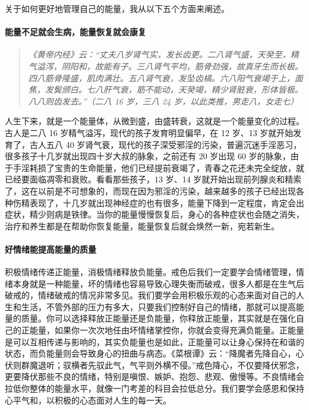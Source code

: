 关于如何更好地管理自己的能量，我从以下五个方面来阐述。

\paragraph{能量不足就会生病，能量恢复就会康复}

\begin{quote}\it
    《黄帝内经》云：“丈夫八岁肾气实，发长齿更。二八肾气盛，天癸至，精气溢泻，阴阳和，故能有子。三八肾气平均，筋骨劲强，故真牙生而长极。四八筋骨隆盛，肌肉满壮。五八肾气衰，发坠齿槁。六八阳气衰竭于上，面焦，发鬓颁白。七八肝气衰，筋不能动，天癸竭，精少肾脏衰，形体皆极。八八则齿发去。”（二八 16 岁，三八 24 岁，以此类推，男走八，女走七）
\end{quote}

人生下来，就是一个能量体，从微到盛，由盛转衰，这就是一个能量变化的过程。古人是二八 16 岁精气溢泻，现代的孩子发育明显偏早，在 12 岁、13 岁就开始发育了，古人五八 40 岁肾气衰，现代的孩子深受邪淫的污染，普遍沉迷手淫恶习，很多孩子十几岁就出现四十岁大叔的脉象，之前还有 20 岁出现 60 岁的脉象，由于手淫耗损了宝贵的生命能量，他们已经提前衰竭了，青春之花还未完全绽放，就已经要面临凋零和衰败。看看那些孩子，13 岁、14 岁就开始出现前列腺炎和精索了，这在以前是不可想象的，而现在因为邪淫的污染，越来越多的孩子已经出现各种伤精表现了，十几岁就出现神经症的也有很多，能量下降到一定程度，肯定会出症状，精少则病是铁律。当你的能量慢慢恢复后，身心的各种症状也会随之消失，治疗和养生都是在帮助你恢复能量，能量恢复后就会焕然一新，宛若新生。

\paragraph{好情绪能提高能量的质量}

积极情绪传递正能量，消极情绪释放负能量。戒色后我们一定要学会情绪管理，情绪本身就是一种能量，坏的情绪也容易导致心理失衡而破戒，很多人都是在生气后破戒的，情绪破戒的情况非常多见。我们要学会用积极乐观的心态来面对自己的人生和生活，不管外部的压力有多大，只要我们控制好自己的情绪，那就可以提高能量的质量。你可以选择释放正能量还是负能量，你释放正能量，其实就是在强化自己的正能量，如果你一次次地任由坏情绪掌控你，你就会变得充满负能量。正能量是可以互相传递与影响的，其实负能量也是如此，正能量可以让身心保持在和谐的状态，而负能量则会导致身心的扭曲与病态。《菜根谭》云：“降魔者先降自心，心伏则群魔退听；驭横者先驭此气，气平则外横不侵。”戒色降心，不仅要降伏邪念，更要降伏那些不良的情绪，特别是嗔恨、嫉妒、抱怨、悲观、傲慢等。不良情绪会拉低你整体的能量水平，就像一门考差的科目会拉低总分。我们要学会感恩和保持心平气和，以积极的心态面对人生的每一天。

